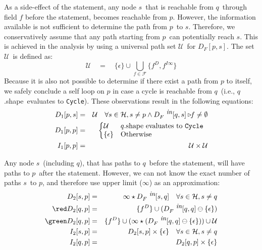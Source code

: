 \documentclass[runningheads,a4paper]{llncs}
\newcommand{\p}{\ensuremath{p}}
\newcommand{\q}{\ensuremath{q}}
\newcommand{\s}{\ensuremath{s}}
\newcommand{\drct}{\ensuremath{D}}
\newcommand{\indrct}{\ensuremath{I}}
\newcommand{\heap}{\ensuremath{\mathcal{H}}}
\newcommand{\fields}{\ensuremath{\mathcal{F}}}
\newcommand{\upath}{\ensuremath{\mathcal{U}}}
\newcommand{\shape}{\mbox{shape}}
\newcommand{\epsilonset}{\ensuremath{\{\epsilon\}}}
\newcommand{\din}{\mbox{\footnotesize\em in}}
\newcommand{\project}[2]{\ensuremath{#1\triangleright\!\!#2}}
\newcommand{\remOne}[2]{\ensuremath{#1 \ominus #2}}
\newcommand{\Cycle}{{\tt Cycle}}
\begin{document}
\begin{enumerate}
As a side-effect of the statement, any node \s\ that is
reachable from \q\ through field $f$ before the statement,
becomes reachable from \p. However, the information available
is not sufficient to determine the path from \p\ to
\s. Therefore, we conservatively assume that any path
starting from \p\ can potentially reach \s. This is achieved
in the analysis by using a universal path set \upath\ for
$D_F[\p,\s]$. The set \upath\ is defined as:
\[ \upath \quad=\quad \epsilonset \cup \bigcup_{f\in\fields} \{f^{\drct},
f^{\indrct\infty}\} \] Because it is also not possible to determine
if there exist a path from $\p$ to itself,  we safely
conclude a self loop on $p$ in case a cycle is reachable
from \q\ (i.e., \q.\shape\ evaluates to \Cycle). 
These
observations result in the following equations:
\begin{eqnarray*}
  D_1[\p, \s] &=&  \upath \quad
  \forall \s \in \heap, \s \not=\p \wedge
  \project{D_F^{\din}[\q, \s]}{f} \not= \emptyset
  \\
  D_1[\p, \p] &=& \left\{\begin{array}{@{}ll}
    \upath& \q.\shape \mbox{ evaluates to } \Cycle \\
    \epsilonset & \mbox{Otherwise}
  \end{array}\right.  \\
  I_1[\p, \p] &=& \upath \times \upath  \\
\end{eqnarray*}

Any node \s\ (including \q), that has paths to \q\ before the
statement, will have paths to \p\ after the
statement. However, we can not know the exact number of paths
\s\ to \p, and therefore use upper limit ($\infty$) as an
approximation:
\begin{eqnarray*}
  D_2[\s, \p] &=& \infty \star D_F^{\din}[\s, \q] \quad
  \forall \s \in \heap, \s \not=\q \\
  {\red D_2[\q,\p]} &=& \{ f^{\drct}\} \cup (\remOne{D_F^{\din}[\q,
      \q]}{\epsilonset}) \\ 
  {\green D_2[\q,\p]} &=& \{ f^{\drct}\} \cup (\infty \star (\remOne{D_F^{\din}[\q, \q]}{\epsilonset})) \cup \upath \\ 
	I_2[\s, \p] &=& D_2[\s, \p] \times
  \epsilonset \quad \forall \s \in \heap, \s \not=\q  \\
	I_2[\q,\p] &=& D_2[\q, \p] \times \epsilonset
\end{eqnarray*}


\end{enumerate}
\end{document}
